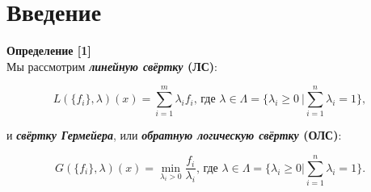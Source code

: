 \section{Введение}

\begin{flushleft}

	\textbf{Определение [1]}\\
	Мы рассмотрим \textbf{\textit{линейную свёртку} (ЛС)}:
	
	\begin{equation}
		L(\{f_i\}, \lambda)(x)=\sum_{i=1}^{m} \lambda_i f_i 
		\textrm{, где }
		\lambda \in \Lambda = \{\lambda_i \geqslant 0 \: | \sum_{i=1}^n \lambda_i =1 \},
	\end{equation}

	и \textbf{\textit{свёртку Гермейера}}, или 
	\textbf{\textit{обратную логическую свёртку} (ОЛС)}:
	
	\begin{equation}
		G(\{f_i\}, \lambda)(x)=\min\limits_{\lambda_i > 0} \frac{f_i}{\lambda_i} 
		\textrm{, 	где }
		\lambda \in \Lambda =\{\lambda_i \geq 0 | \sum_{i=1}^n \lambda_i =1 \}.
	\end{equation}

\end{flushleft}